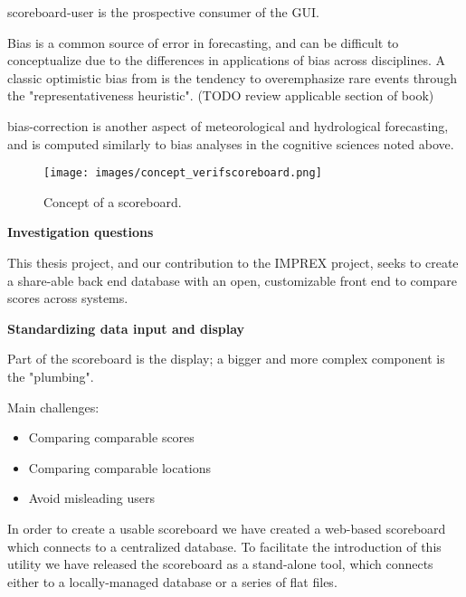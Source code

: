 \documentclass[logos,parttoc,morelanguage=french,morelanguage=italian]{orsay-memoire}
\begin{document}
\gls{scoreboard-user} is the prospective consumer of the GUI.


Bias is a common source of error in forecasting, and can be difficult to conceptualize due to the differences in applications of bias across disciplines. A classic optimistic bias from \cite{kahneman2011thinking} is the tendency to overemphasize rare events through the "representativeness heuristic". (TODO review applicable section of book)

\gls{bias-correction} is another aspect of meteorological and hydrological forecasting, and is computed similarly to bias analyses in the cognitive sciences noted above.


\begin{figure}
\texttt{[image: images/concept\_verifscoreboard.png]}
  \caption{Concept of a scoreboard.}
  \label{fig:scoreboard concept}
\end{figure}

\textbf{Investigation questions}

\par This thesis project, and our contribution to the IMPREX project, seeks to create a share-able back end database with an open, customizable front end to compare scores across systems.

\textbf{Standardizing data input and display}

Part of the scoreboard is the display; a bigger and more complex component is the "plumbing".

Main challenges:
\begin{itemize}
\item Comparing comparable scores
\item Comparing comparable locations
\item Avoid misleading users
\end{itemize}

In order to create a usable scoreboard we have created a web-based scoreboard which connects to a centralized database. To facilitate the introduction of this utility we have released the scoreboard as a stand-alone tool, which connects either to a locally-managed database or a series of flat files.



\end{document}
